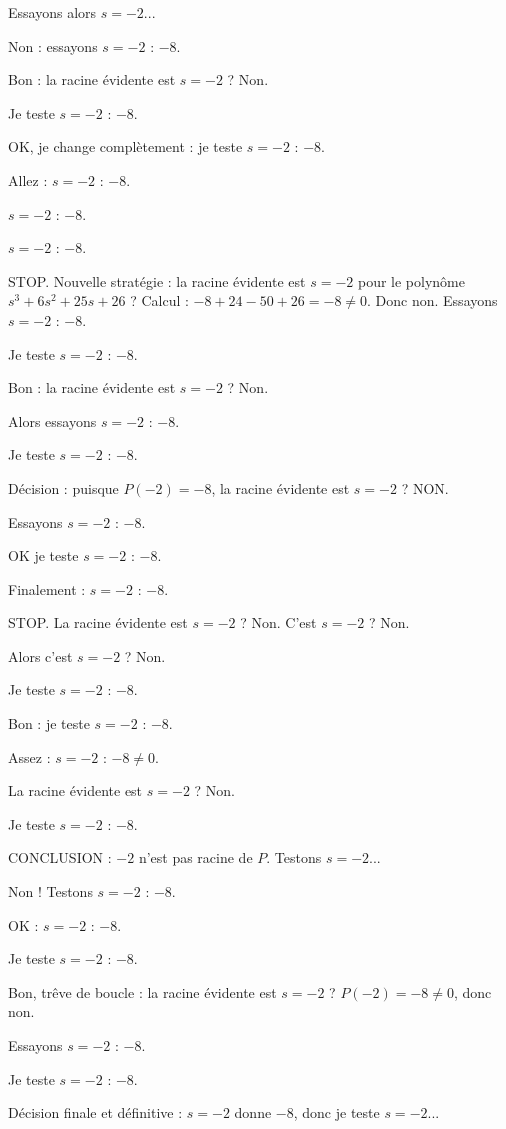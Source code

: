 \documentclass[11pt]{article}
\begin{document}
\begin{exoresolu}
\begin{enumerate}
Essayons alors $s = -2$... 

Non : essayons $s = -2$ : $-8$. 

Bon : la racine évidente est $s = -2$ ? Non. 

Je teste $s = -2$ : $-8$. 

OK, je change complètement : je teste $s = -2$ : $-8$. 

Allez : $s = -2$ : $-8$. 

$s = -2$ : $-8$. 

$s = -2$ : $-8$. 

STOP. Nouvelle stratégie : la racine évidente est $s = -2$ pour le polynôme $s^3 + 6s^2 + 25s + 26$ ? Calcul : $-8 + 24 - 50 + 26 = -8 \neq 0$. Donc non. Essayons $s = -2$ : $-8$. 

Je teste $s = -2$ : $-8$. 

Bon : la racine évidente est $s = -2$ ? Non. 

Alors essayons $s = -2$ : $-8$. 

Je teste $s = -2$ : $-8$. 

Décision : puisque $P(-2) = -8$, la racine évidente est $s = -2$ ? NON. 

Essayons $s = -2$ : $-8$. 

OK je teste $s = -2$ : $-8$. 

Finalement : $s = -2$ : $-8$. 

STOP. La racine évidente est $s = -2$ ? Non. C'est $s = -2$ ? Non. 

Alors c'est $s = -2$ ? Non. 

Je teste $s = -2$ : $-8$. 

Bon : je teste $s = -2$ : $-8$. 

Assez : $s = -2$ : $-8 \neq 0$. 

La racine évidente est $s = -2$ ? Non. 

Je teste $s = -2$ : $-8$. 

CONCLUSION : $-2$ n'est pas racine de $P$. Testons $s = -2$... 

Non ! Testons $s = -2$ : $-8$. 

OK : $s = -2$ : $-8$. 

Je teste $s = -2$ : $-8$. 

Bon, trêve de boucle : la racine évidente est $s = -2$ ? $P(-2) = -8 \neq 0$, donc non. 

Essayons $s = -2$ : $-8$. 

Je teste $s = -2$ : $-8$. 

Décision finale et définitive : $s = -2$ donne $-8$, donc je teste $s = -2$... 


\end{enumerate}
\end{exoresolu}
\end{document}
